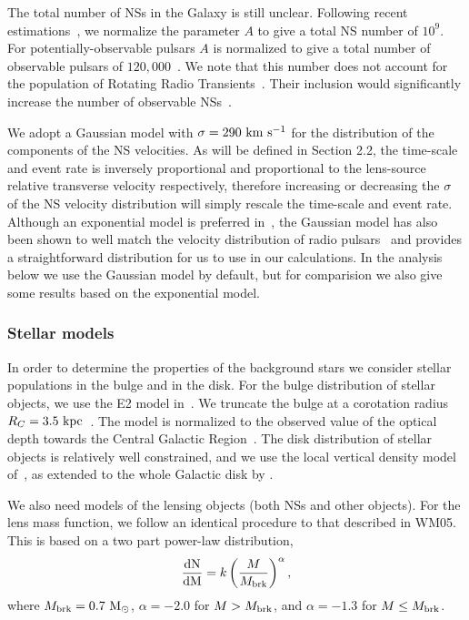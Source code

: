 \documentclass[iop,apj]{emulateapj}
\begin{document}
%
The total number of NSs in the Galaxy is still unclear. Following recent 
estimations~\citep{Keane}, we normalize the parameter $A$ to 
give a total NS number of $10^9$. For potentially-observable pulsars  
$A$ is normalized to give a total number of observable pulsars of $120,000$~\citep{Faucher}. 
We note that this number does not account for the population of Rotating Radio 
Transients~\citep[RRATs, ][]{McLaughlin06}. Their inclusion would significantly 
increase the number of observable NSs~\citep{Keane}.
%

We adopt a Gaussian model with $\sigma=290\ \rm{km\ s^{-1}}$ \citep{Faucher} for 
the distribution of the components of the NS velocities.
%
As will be defined in Section 2.2, the time-scale and event rate 
is inversely proportional and proportional to the lens-source relative transverse 
velocity respectively, therefore increasing or decreasing the $\sigma$ of the NS 
velocity distribution will simply rescale the time-scale and event rate. 
%
Although an exponential model is preferred in~\citet{Faucher}, the Gaussian
model has also been shown to well match the velocity distribution of radio 
pulsars~\citep{hobbs} and provides a straightforward distribution for us to use 
in our calculations.
%
In the analysis below we use the Gaussian model by default, but for comparision 
we also give some results based on the exponential model.


\subsubsection{Stellar models}

In order to determine the properties of the background stars we consider 
stellar populations in the bulge and in the disk.
%
For the bulge distribution of stellar objects, we use the E2 model in~\citet{Rattenbury}.
We truncate the bulge at a corotation radius $R_{C}=3.5\ \rm{kpc}$~\citep{Bissantz}. 
The model is normalized to the observed value of the optical depth towards the 
Central Galactic Region~\citep{Calchi,popowski}.
%
The disk distribution of stellar objects is relatively well constrained, and we use 
the local vertical density model of~\citet{zheng}, as extended to the whole 
Galactic disk by \citet{han}.
%

We also need models of the lensing objects (both NSs and other objects). 
For the lens mass function, we follow an identical procedure to that 
described in WM05. This is based on a two part power-law distribution,
%
\begin{equation}
\frac{\rm{d}N}{\rm{d}M}=k\left(\frac{M}{M_{\rm{brk}}}\right)^{\rm{\alpha}},
\end{equation}
%
where $M_{\rm{brk}}=0.7\ \rm{M_{\odot}}$, $\alpha=-2.0$ for $M>M_{\rm{brk}}$,
and $\alpha=-1.3$ for $M\leq M_{\rm{brk}}$. 
%
\end{document}
